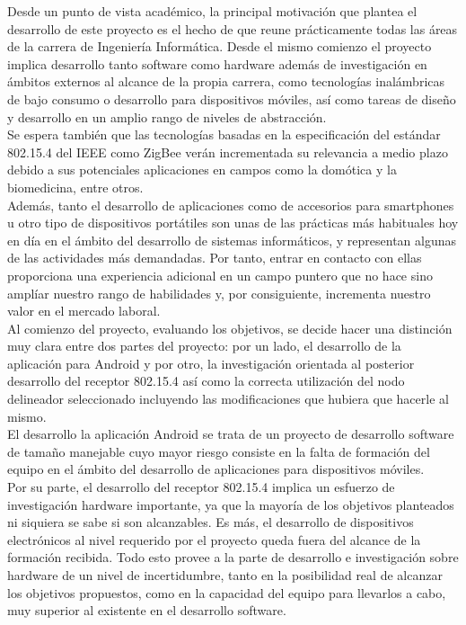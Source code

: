 	Desde un punto de vista académico, la principal motivación que plantea el desarrollo de este
	proyecto es el hecho de que reune prácticamente todas las áreas de la carrera de Ingeniería
	Informática. Desde el mismo comienzo el proyecto implica desarrollo tanto software como
	hardware además de investigación en ámbitos externos al alcance de la propia carrera,
	como tecnologías inalámbricas de bajo consumo	o desarrollo para dispositivos móviles, así como 
	tareas de diseño y desarrollo en un amplio rango de niveles de abstracción.\\

	Se espera también que las tecnologías basadas en la especificación del estándar 802.15.4 del IEEE
	como ZigBee verán incrementada su relevancia a medio plazo debido a sus potenciales aplicaciones en
	campos como la domótica y la biomedicina, entre otros.\\

	Además, tanto el desarrollo de aplicaciones como de accesorios para smartphones u otro tipo de
	dispositivos portátiles son unas de las prácticas más habituales hoy en día en el ámbito del
	desarrollo de sistemas informáticos, y representan algunas de las actividades más demandadas. Por
	tanto, entrar en contacto con ellas proporciona una experiencia adicional en un campo puntero que
	no hace sino amplíar nuestro rango de habilidades y, por consiguiente, incrementa nuestro valor en 
	el mercado laboral.\\

	Al comienzo del proyecto, evaluando los objetivos, se decide hacer una distinción muy clara entre dos partes del proyecto: por un lado, el desarrollo de la aplicación para Android y por otro, la investigación orientada al posterior desarrollo del receptor 802.15.4 así como la correcta utilización del nodo delineador seleccionado incluyendo las modificaciones que hubiera que hacerle al mismo.\\

	El desarrollo la aplicación Android se trata de un proyecto de desarrollo software de tamaño manejable cuyo mayor riesgo consiste en la falta de formación del equipo en el ámbito del desarrollo de aplicaciones para dispositivos móviles.\\

	Por su parte, el desarrollo del receptor 802.15.4 implica un esfuerzo de investigación hardware importante, ya que la mayoría de los objetivos planteados ni siquiera se sabe si son alcanzables. Es más, el desarrollo de dispositivos electrónicos al nivel requerido por el proyecto queda fuera del alcance de la formación recibida. Todo esto provee a la parte de desarrollo e investigación sobre hardware de un nivel de incertidumbre, tanto en la posibilidad real de alcanzar los objetivos propuestos, como en la capacidad del equipo para llevarlos a cabo, muy superior al existente en el desarrollo software.\\

